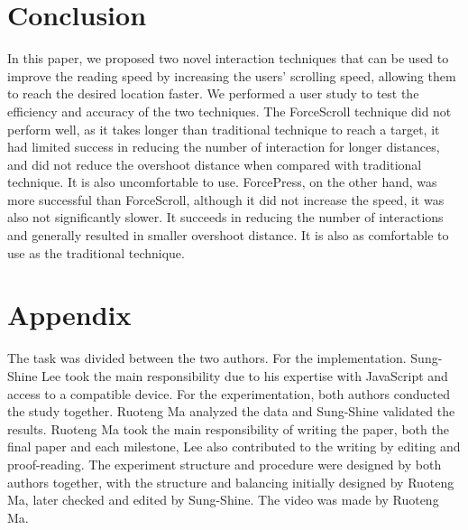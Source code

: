 \documentclass{sigchi}
\begin{document}
    
\section{Conclusion}
In this paper, we proposed two novel interaction techniques that can be used to improve the reading speed by increasing the users' scrolling speed, allowing them to reach the desired location faster. We performed a user study to test the efficiency and accuracy of the two techniques. The ForceScroll technique did not perform well, as it takes longer than traditional technique to reach a target, it had limited success in reducing the number of interaction for longer distances, and did not reduce the overshoot distance when compared with traditional technique. It is also uncomfortable to use. ForcePress, on the other hand, was more successful than ForceScroll, although it did not increase the speed, it was also not significantly slower. It succeeds in reducing the number of interactions and generally resulted in smaller overshoot distance. It is also as comfortable to use as the traditional technique.      

\balance{}




\section{Appendix}
The task was divided between the two authors. For the implementation. Sung-Shine Lee took the main responsibility due to his expertise with JavaScript and access to a compatible device. For the experimentation, both authors conducted the study together. Ruoteng Ma analyzed the data and Sung-Shine validated the results. Ruoteng Ma took the main responsibility of writing the paper, both the final paper and each milestone, Lee also contributed to the writing by editing and proof-reading. The experiment structure and procedure were designed by both authors together, with the structure and balancing initially designed by Ruoteng Ma, later checked and edited by Sung-Shine. The video was made by Ruoteng Ma.  
\end{document}
